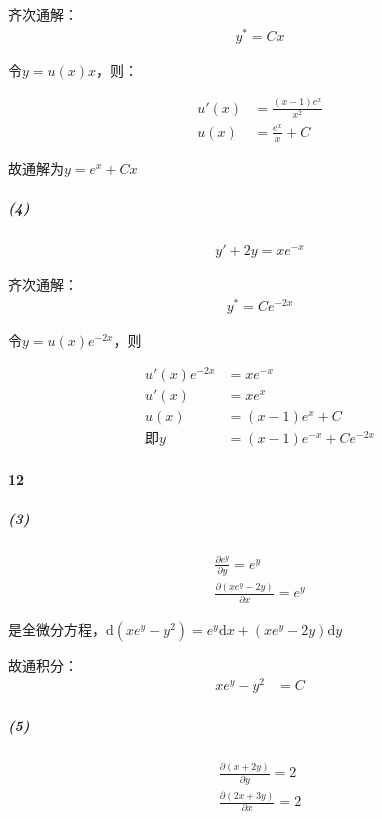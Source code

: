 \documentclass[UTF8]{ctexart}
\begin{document}
    齐次通解：
    \begin{align*}
        y^* = Cx
    \end{align*}

    令$y= u(x)x$，则：

    \begin{align*}
        u'(x) &= \frac{(x-1)e^x}{x^2} \\
        u(x) &= \frac{e^x}{x} + C
    \end{align*}

    故通解为$y=e^x + Cx$

    \subparagraph*{(4)}
    \begin{align*}
        y' + 2y = xe^{-x}
    \end{align*}

    齐次通解：
    \begin{align*}
        y^* = Ce^{-2x}
    \end{align*}

    令$y = u(x) e^{-2x}$，则

    \begin{align*}
        u'(x)e^{-2x} &= xe^{-x} \\
        u'(x) &= xe^x \\
        u(x) &= (x-1)e^x + C \\
        \text{即} y &= (x-1)e^{-x} + Ce^{-2x}
    \end{align*}

    \paragraph*{12}
    \subparagraph{(3)}
    \begin{align*}
        \frac{\partial e^y}{\partial y} = e^y \\
        \frac{\partial (xe^y-2y)}{\partial x} = e^y
    \end{align*}

    是全微分方程，$\mathrm{d}(xe^y-y^2) = e^y \mathrm{d}x + (xe^y-2y)\mathrm{d}y$

    故通积分：
    \begin{align*}
        xe^y-y^2 &= C
    \end{align*}
    
    \subparagraph{(5)}
    \begin{align*}
        \frac{\partial (x+2y)}{\partial y} = 2 \\
        \frac{\partial (2x+3y)}{\partial x} = 2
    \end{align*}
\end{document}
